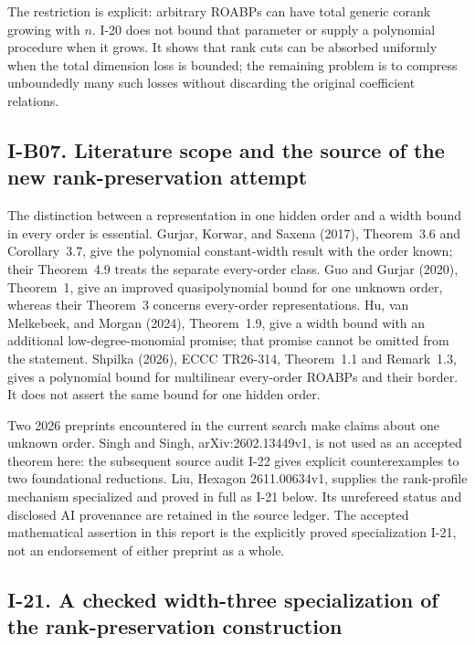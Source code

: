 The restriction is explicit: arbitrary ROABPs can have total
generic corank growing with $n$.  I-20 does not bound that parameter
or supply a polynomial procedure when it grows.  It shows that
rank cuts can be absorbed uniformly when the total dimension loss
is bounded; the remaining problem is to compress unboundedly many
such losses without discarding the original coefficient relations.

\subsection{I-B07. Literature scope and the source of the new rank-preservation attempt}
\label{I-B07}

The distinction between a representation in one hidden order and a
width bound in every order is essential.  Gurjar, Korwar, and Saxena
(2017), Theorem~3.6 and Corollary~3.7, give the polynomial
constant-width result with the order known; their Theorem~4.9 treats
the separate every-order class.  Guo and Gurjar (2020), Theorem~1,
give an improved quasipolynomial bound for one unknown order,
whereas their Theorem~3 concerns every-order representations.
Hu, van Melkebeek, and Morgan (2024), Theorem~1.9, give a width
bound with an additional low-degree-monomial promise; that promise
cannot be omitted from the statement.  Shpilka (2026), ECCC
TR26-314, Theorem~1.1 and Remark~1.3, gives a polynomial bound for
multilinear every-order ROABPs and their border.  It does not
assert the same bound for one hidden order.

Two 2026 preprints encountered in the current search make claims
about one unknown order.  Singh and Singh, arXiv:2602.13449v1, is
not used as an accepted theorem here: the subsequent source audit
I-22 gives explicit counterexamples to two foundational reductions.  Liu, Hexagon 2611.00634v1, supplies the rank-profile
mechanism specialized and proved in full as I-21 below.  Its
unrefereed status and disclosed AI provenance are retained in the
source ledger.  The accepted mathematical assertion in this report
is the explicitly proved specialization I-21, not an endorsement
of either preprint as a whole.

\subsection{I-21. A checked width-three specialization of the rank-preservation construction}
\label{I-21}


